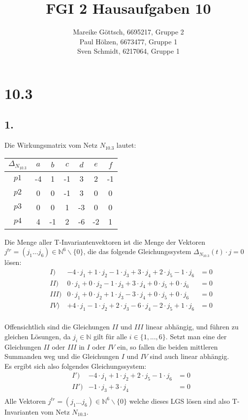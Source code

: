 \documentclass[12pt, paper=a4]{article}
\author{Mareike G\"ottsch, 6695217, Gruppe 2\\Paul H\"olzen, 6673477, Gruppe 1\\Sven Schmidt, 6217064, Gruppe 1}
\title{FGI 2 Hausaufgaben 10}
\begin{document}
\maketitle
\section*{10.3}

\subsection*{1.}
Die Wirkungsmatrix vom Netz \(N_{10.3}\) lautet:\\
\begin{center}
\begin{tabular}{ | c | c c c c c c | }
	\hline
	$\Delta_{N_{10.3}}$ & $a$ & $b$ & $c$ & $d$ & $e$ & $f$\\
	\hline
	$p1$ & -4 & 1 & -1 & 3 & 2 & -1\\
	$p2$ & 0 & 0 & -1 & 3 & 0 & 0\\
	$p3$ & 0 & 0 & 1 & -3 & 0 & 0\\
	$p4$ & 4 & -1 & 2 & -6 & -2 & 1\\
	\hline
\end{tabular}
\end{center}

Die Menge aller T-Invariantenvektoren ist die Menge der Vektoren $j^{tr} = (j_1 ... j_6) \in \mathbb{N}^6\backslash \{0\}$,
die das folgende Gleichungssystem \(\Delta_{N_{10.3}}(t) \cdot j = 0 \) l\"osen:\\

\begin{align*}
	&I) &-4\cdot j_1 + 1\cdot j_2 - 1\cdot j_3 + 3\cdot j_4 + 2\cdot j_5 - 1\cdot j_6 &= 0\\
	&II) &0\cdot j_1 + 0\cdot j_2 - 1\cdot j_3 + 3\cdot j_4 + 0\cdot j_5 + 0\cdot j_6 &= 0\\
	&III) &0\cdot j_1 + 0\cdot j_2 + 1\cdot j_3 - 3\cdot j_4 + 0\cdot j_5 + 0\cdot j_6 &= 0\\
	&IV) &+4\cdot j_1 - 1\cdot j_2 + 2\cdot j_3 - 6\cdot j_4 - 2\cdot j_5 + 1\cdot j_6 &= 0\\
\end{align*}

Offensichtlich sind die Gleichungen $II$ und $III$ linear abh\"angig, und f\"uhren zu gleichen L\"osungen, da \(j_i \in \mathbb{N}\) gilt f\"ur alle \(i \in \{1,...,6\}\). Setzt man eine der Gleichungen $II$ oder $III$ in $I$ oder $IV$ ein, so fallen die beiden mittleren Summanden weg und die Gleichungen $I$ und $IV$ sind auch linear abh\"angig.\\
Es ergibt sich also folgendes Gleichungssystem:\\
\begin{align*}
	&I') &-4\cdot j_1 + 1\cdot j_2 + 2\cdot j_5 - 1\cdot j_6 &= 0\\
	&II') & - 1\cdot j_3 + 3\cdot j_4 &= 0\\
\end{align*}
Alle Vektoren $j^{tr} = (j_1 ... j_6) \in \mathbb{N}^6\backslash \{0\}$ welche dieses LGS l\"osen sind also T-Invarianten vom Netz \(N_{10.3}\).
\end{document}
